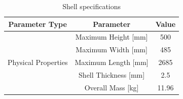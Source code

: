 \documentclass[main.tex]{subfiles}
\begin{document}
\begin{table}
\centering
  \begin{tabular}{@{}ccc@{}} \toprule
    Parameter Type & Parameter & Value \\ \midrule
    \multirow{5}{4em}{Physical Properties} & Maximum Height [\si{mm}] & 500 \\
    & Maximum Width [\si{mm}] & 485 \\
    & Maximum Length [\si{mm}] & 2685 \\
    & Shell Thickness [\si{mm}] & 2.5 \\
    & Overall Mass [\si{kg}] & 11.96 \\
    \bottomrule
  \end{tabular}
  \caption{Shell specifications}
  \label{table:shelltable}
\end{table}
\end{document}
